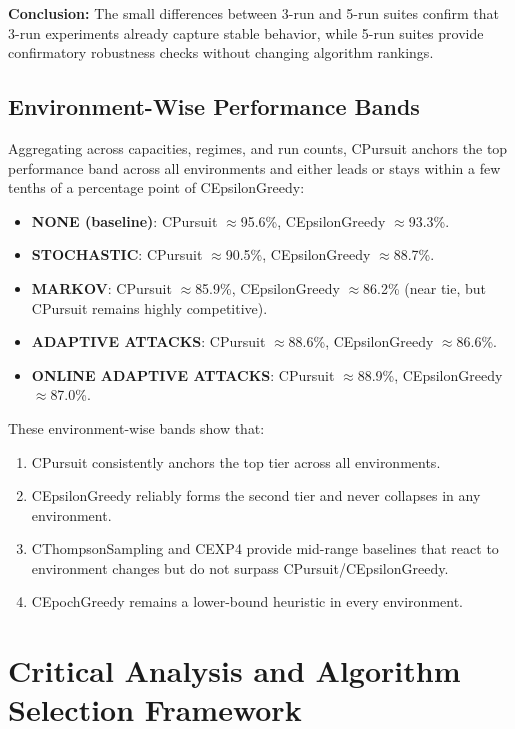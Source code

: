 \documentclass[12pt,a4paper]{article}
\begin{document}
\textbf{Conclusion:} The small differences between 3-run and 5-run suites confirm that 3-run experiments already capture stable behavior, while 5-run suites provide confirmatory robustness checks without changing algorithm rankings.

\subsection{Environment-Wise Performance Bands}

Aggregating across capacities, regimes, and run counts, CPursuit anchors the top performance band across all environments and either leads or stays within a few tenths of a percentage point of CEpsilonGreedy:

\begin{itemize}
\item \textbf{NONE (baseline)}: CPursuit $\approx$95.6\%, CEpsilonGreedy $\approx$93.3\%.
\item \textbf{STOCHASTIC}: CPursuit $\approx$90.5\%, CEpsilonGreedy $\approx$88.7\%.
\item \textbf{MARKOV}: CPursuit $\approx$85.9\%, CEpsilonGreedy $\approx$86.2\% (near tie, but CPursuit remains highly competitive).
\item \textbf{ADAPTIVE ATTACKS}: CPursuit $\approx$88.6\%, CEpsilonGreedy $\approx$86.6\%.
\item \textbf{ONLINE ADAPTIVE ATTACKS}: CPursuit $\approx$88.9\%, CEpsilonGreedy $\approx$87.0\%.
\end{itemize}

These environment-wise bands show that:

\begin{enumerate}
\item CPursuit consistently anchors the top tier across all environments.
\item CEpsilonGreedy reliably forms the second tier and never collapses in any environment.
\item CThompsonSampling and CEXP4 provide mid-range baselines that react to environment changes but do not surpass CPursuit/CEpsilonGreedy.
\item CEpochGreedy remains a lower-bound heuristic in every environment.
\end{enumerate}

\newpage
\section{Critical Analysis and Algorithm Selection Framework}
\end{document}
